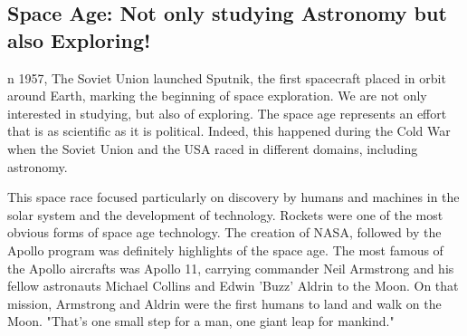 \subsection{Space Age: Not only studying Astronomy but also Exploring!}
n 1957, The Soviet Union launched Sputnik, the first spacecraft placed in orbit around Earth, marking the beginning of space exploration.
We are not only interested in studying, but also of exploring.
The space age represents an effort that is as scientific as it is political.
Indeed, this happened during the Cold War when the Soviet Union and the USA raced in different domains, including astronomy.

This space race focused particularly on discovery by humans and machines in the solar system and the development of technology.
Rockets were one of the most obvious forms of space age technology.
The creation of NASA, followed by the Apollo program was definitely highlights of the space age.
The most famous of the Apollo aircrafts was Apollo 11, carrying commander Neil Armstrong and his fellow astronauts Michael Collins and Edwin 'Buzz' Aldrin to the Moon.
On that mission, Armstrong and Aldrin were the first humans to land and walk on the Moon.
"That's one small step for a man, one giant leap for mankind."
\cite{SpaceAge}